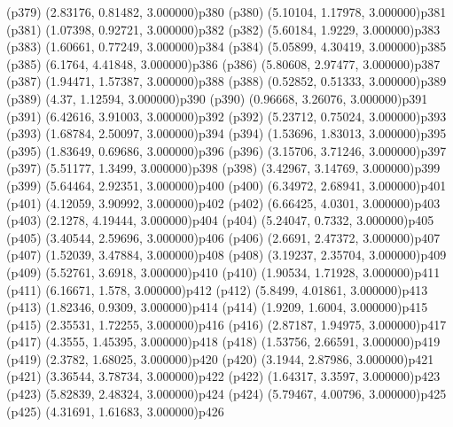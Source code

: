 \psdot(p379)
\psPoint(2.83176, 0.81482, 3.000000){p380}
\psdot(p380)
\psPoint(5.10104, 1.17978, 3.000000){p381}
\psdot(p381)
\psPoint(1.07398, 0.92721, 3.000000){p382}
\psdot(p382)
\psPoint(5.60184, 1.9229, 3.000000){p383}
\psdot(p383)
\psPoint(1.60661, 0.77249, 3.000000){p384}
\psdot(p384)
\psPoint(5.05899, 4.30419, 3.000000){p385}
\psdot(p385)
\psPoint(6.1764, 4.41848, 3.000000){p386}
\psdot(p386)
\psPoint(5.80608, 2.97477, 3.000000){p387}
\psdot(p387)
\psPoint(1.94471, 1.57387, 3.000000){p388}
\psdot(p388)
\psPoint(0.52852, 0.51333, 3.000000){p389}
\psdot(p389)
\psPoint(4.37, 1.12594, 3.000000){p390}
\psdot(p390)
\psPoint(0.96668, 3.26076, 3.000000){p391}
\psdot(p391)
\psPoint(6.42616, 3.91003, 3.000000){p392}
\psdot(p392)
\psPoint(5.23712, 0.75024, 3.000000){p393}
\psdot(p393)
\psPoint(1.68784, 2.50097, 3.000000){p394}
\psdot(p394)
\psPoint(1.53696, 1.83013, 3.000000){p395}
\psdot(p395)
\psPoint(1.83649, 0.69686, 3.000000){p396}
\psdot(p396)
\psPoint(3.15706, 3.71246, 3.000000){p397}
\psdot(p397)
\psPoint(5.51177, 1.3499, 3.000000){p398}
\psdot(p398)
\psPoint(3.42967, 3.14769, 3.000000){p399}
\psdot(p399)
\psPoint(5.64464, 2.92351, 3.000000){p400}
\psdot(p400)
\psPoint(6.34972, 2.68941, 3.000000){p401}
\psdot(p401)
\psPoint(4.12059, 3.90992, 3.000000){p402}
\psdot(p402)
\psPoint(6.66425, 4.0301, 3.000000){p403}
\psdot(p403)
\psPoint(2.1278, 4.19444, 3.000000){p404}
\psdot(p404)
\psPoint(5.24047, 0.7332, 3.000000){p405}
\psdot(p405)
\psPoint(3.40544, 2.59696, 3.000000){p406}
\psdot(p406)
\psPoint(2.6691, 2.47372, 3.000000){p407}
\psdot(p407)
\psPoint(1.52039, 3.47884, 3.000000){p408}
\psdot(p408)
\psPoint(3.19237, 2.35704, 3.000000){p409}
\psdot(p409)
\psPoint(5.52761, 3.6918, 3.000000){p410}
\psdot(p410)
\psPoint(1.90534, 1.71928, 3.000000){p411}
\psdot(p411)
\psPoint(6.16671, 1.578, 3.000000){p412}
\psdot(p412)
\psPoint(5.8499, 4.01861, 3.000000){p413}
\psdot(p413)
\psPoint(1.82346, 0.9309, 3.000000){p414}
\psdot(p414)
\psPoint(1.9209, 1.6004, 3.000000){p415}
\psdot(p415)
\psPoint(2.35531, 1.72255, 3.000000){p416}
\psdot(p416)
\psPoint(2.87187, 1.94975, 3.000000){p417}
\psdot(p417)
\psPoint(4.3555, 1.45395, 3.000000){p418}
\psdot(p418)
\psPoint(1.53756, 2.66591, 3.000000){p419}
\psdot(p419)
\psPoint(2.3782, 1.68025, 3.000000){p420}
\psdot(p420)
\psPoint(3.1944, 2.87986, 3.000000){p421}
\psdot(p421)
\psPoint(3.36544, 3.78734, 3.000000){p422}
\psdot(p422)
\psPoint(1.64317, 3.3597, 3.000000){p423}
\psdot(p423)
\psPoint(5.82839, 2.48324, 3.000000){p424}
\psdot(p424)
\psPoint(5.79467, 4.00796, 3.000000){p425}
\psdot(p425)
\psPoint(4.31691, 1.61683, 3.000000){p426}
